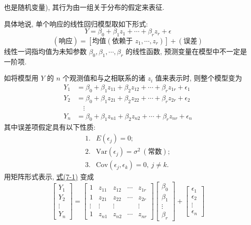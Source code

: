 
也是随机变量), 其行为由一组关于分布的假定来表征.

具体地说, 单个响应的线性回归模型取如下形式:
\[
Y = \beta_0+\beta_1 z_1+\cdots+\beta_r z_r+\epsilon
\]
\[
(\text{响应})=[\text{均值}(\text{依赖于 } z_1,\cdots,z_r)]+(\text{误差})
\]
线性一词指均值为未知参数 $\beta_0,\beta_1,\cdots,\beta_r$ 的线性函数, 预测变量在模型中不一定是一阶项.

如将模型用 $Y$ 的 $n$ 个观测值和与之相联系的诸 $z_i$ 值来表示时, 则整个模型变为
\label{eq:7-1}
\begin{equation}
\begin{aligned}
Y_1 &= \beta_0+\beta_1 z_{11}+\beta_2 z_{12}+\cdots+\beta_r z_{1r}+\epsilon_1\\
Y_2 &= \beta_0+\beta_1 z_{21}+\beta_2 z_{22}+\cdots+\beta_r z_{2r}+\epsilon_2\\
&\quad\vdots\\
Y_n &= \beta_0+\beta_1 z_{n1}+\beta_2 z_{n2}+\cdots+\beta_r z_{nr}+\epsilon_n
\end{aligned}
\tag{7-1}
\end{equation}
其中误差项假定具有以下性质:
\label{eq:7-2}
\begin{equation}
\begin{array}{ll}
1. & E(\epsilon_j)=0;\\
2. & \text{Var}(\epsilon_j)=\sigma^2\ (\text{常数});\\
3. & \text{Cov}(\epsilon_j,\epsilon_k)=0,\ j\neq k.
\end{array}
\tag{7-2}
\end{equation}
用矩阵形式表示, \hyperref[eq:7-1]{式(7-1)} 变成
\[
\begin{bmatrix}Y_1\\Y_2\\\vdots\\Y_n\end{bmatrix}
=
\begin{bmatrix}
1&z_{11}&z_{12}&\cdots&z_{1r}\\
1&z_{21}&z_{22}&\cdots&z_{2r}\\
\vdots&\vdots&\vdots&&\vdots\\
1&z_{n1}&z_{n2}&\cdots&z_{nr}
\end{bmatrix}
\begin{bmatrix}\beta_0\\\beta_1\\\vdots\\\beta_r\end{bmatrix}
+
\begin{bmatrix}\epsilon_1\\\epsilon_2\\\vdots\\\epsilon_n\end{bmatrix}
\]
